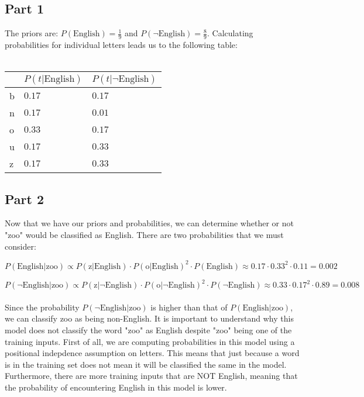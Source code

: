 \documentclass{article}%
\begin{document}
\subsection*{Part 1}
The priors are: $P(\text{English}) = \frac{1}{9}$ and $P(\neg{\text{English}}) = \frac{8}{9}$.
Calculating probabilities for individual letters leads us to the following table:\\
\\
\begin{tabular}{| l | l | l |}
    \hline
        & $P(t | \text{English})$   & $P(t | \neg{\text{English}})$ \\ \hline
    b   & $0.17$             & $0.17$ \\ \hline
    n   & $0.17$             & $0.01$ \\ \hline
    o   & $0.33$             & $0.17$ \\ \hline
    u   & $0.17$             & $0.33$ \\ \hline
    z   & $0.17$             & $0.33$ \\ \hline
\end{tabular}
\subsection*{Part 2}
Now that we have our priors and probabilities, we can determine whether or not "zoo" would be classified as English. There are
two probabilities that we must consider:

$P(\text{English} | \text{zoo}) \propto
P(\text{z} | \text{English}) \cdot P(\text{o} | \text{English})^2 \cdot P(\text{English})
\approx 0.17 \cdot 0.33^2 \cdot 0.11
= 0.002
$

$P(\neg\text{English} | \text{zoo}) \propto
P(\text{z} | \neg\text{English}) \cdot P(\text{o} | \neg\text{English})^2 \cdot P(\neg\text{English})
\approx 0.33 \cdot 0.17^2 \cdot 0.89
= 0.008$\\
\\
Since the probability $P(\neg\text{English} | \text{zoo})$ is higher than that of $P(\text{English} | \text{zoo})$, we can classify
zoo as being non-English. It is important to understand why this model does not classify the word "zoo" as English despite "zoo" being
one of the training inputs. First of all, we are computing probabilities in this model using a positional indepdence assumption on letters. This
means that just because a word is in the training set does not mean it will be classified the same in the model. Furthermore, there are more
training inputs that are NOT English, meaning that the probability of encountering English in this model is lower.
\end{document}
